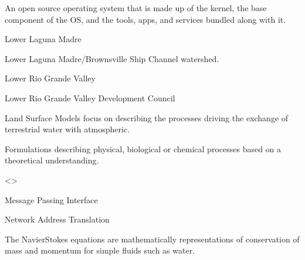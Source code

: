 \documentclass[letterpaper,12pt,english,openany,oneside]{sphinxmanual}
\begin{document}
\begin{description}
\sphinxAtStartPar
An open source operating system that is made up of the kernel, the base component of the OS, and the tools, apps, and services bundled along with it.

\sphinxAtStartPar
Lower Laguna Madre

\sphinxAtStartPar
Lower Laguna Madre/Brownsville Ship Channel watershed.

\sphinxAtStartPar
Lower Rio Grande Valley

\sphinxAtStartPar
Lower Rio Grande Valley Development Council

\sphinxAtStartPar
Land Surface Models focus on describing the processes driving the exchange of terrestrial water with atmospheric.

\sphinxAtStartPar
Formulations describing physical, biological or chemical processes based on a theoretical understanding.

\sphinxAtStartPar
\textless{}\textgreater{}

\sphinxAtStartPar
Message Passing Interface

\sphinxAtStartPar
Network Address Translation

\sphinxAtStartPar
The Navier\sphinxhyphen{}Stokes equations are mathematically representations of conservation of mass and momentum for simple fluids such as water.


\end{description}
\end{document}
